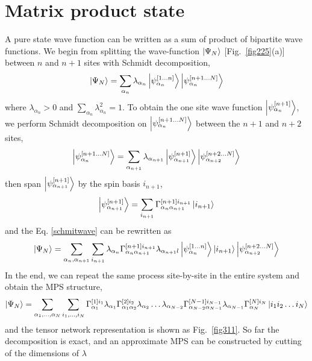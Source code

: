 \section{Matrix product state}
\label{MPS}

A pure state wave function can be written as a sum of product of bipartite wave functions. We begin from splitting the wave-function $\Ket{\Psi_N}$ [Fig.~\ref{fig225}(a)] between $n$ and $n+1$ sites with Schmidt decomposition, 
\begin{align}
	\label{schmitwave}
	\Ket{\Psi_{N}} = \sum_{\alpha_n} \lambda_{\alpha_n} \Ket{\psi_{\alpha_n}^{[1\dots n]}} \Ket{\psi_{\alpha_n}^{[n+1\dots N]}}
\end{align}
where $\lambda_{\alpha_n} > 0$ and $\sum\limits_{\alpha_n}{\lambda_{\alpha_n}^2 = 1}$. To obtain the one site wave function $\Ket{\psi_{\alpha_n}^{[n+1]}}$, we perform Schmidt decomposition on $\Ket{\psi_{\alpha_n}^{[n+1\dots N]}}$ between the $n+1$ and $n+2$ sites,
\begin{align}
	\Ket{\psi_{\alpha_n}^{[n+1\dots N]}} = \sum_{\alpha_{n+1}} \lambda_{\alpha_{n+1}} \Ket{\psi_{\alpha_{n+1}}^{[n+1]}} \Ket{\psi_{\alpha_{n+2}}^{[n+2\dots N]}}
\end{align}
then span $\Ket{\psi_{\alpha_{n+1}}^{[n+1]}}$ by the spin basis $i_{n+1}$,
\begin{align}
	\Ket{\psi_{\alpha_{n+1}}^{[n+1]}} = \sum_{i_{n+1}}{\Gamma^{[n+1] i_{n+1}}_{\alpha_n \alpha_{n+1}} \Ket{i_{n+1}}}
\end{align}
and the Eq. \ref{schmitwave} can be rewritten as
\begin{align}
	\Ket{\Psi_{N}} = \sum_{\alpha_n,\alpha_{n+1}}\sum_{i_{n+1}}{\lambda_{\alpha_n} \Gamma^{[n+1] i_{n+1}}_{\alpha_n \alpha_{n+1}} \lambda_{\alpha_{n+1}l} \Ket{\psi_{\alpha_n}^{[1\dots n]}} \Ket{i_{n+1}} \Ket{\psi_{\alpha_{n+2}}^{[n+2\dots N]}} }
\end{align}
In the end, we can repeat the same process site-by-site in the entire system and obtain the MPS structure,
\begin{align}
	\Ket{\Psi_N} = \sum_{\alpha_1,\dots ,\alpha_N}\sum_{i_1,\dots ,i_N}{ \Gamma^{[1] i_{1}}_{\alpha_1} \lambda_{\alpha_1} \Gamma^{[2] i_{2}}_{\alpha_1 \alpha_{2}} \lambda_{\alpha_2} \dots  \lambda_{\alpha_{N-2}} \Gamma^{[N-1] i_{N-1}}_{\alpha_{N-2} \alpha_{N-1}} \lambda_{\alpha_{N-1}} \Gamma^{[N] i_{N}}_{\alpha_{N}} \Ket{i_1 i_2 \dots i_N}}
\end{align}
and the tensor network representation is shown as Fig.~\ref{fig311}. So far the decomposition is exact, and an approximate MPS can be constructed by cutting of the dimensions of $\lambda$

